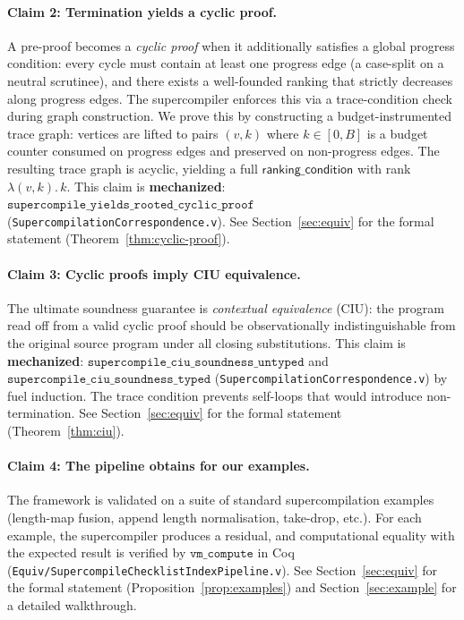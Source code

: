 \paragraph{Claim 2: Termination yields a cyclic proof.}
A pre-proof becomes a \emph{cyclic proof} when it additionally satisfies a global progress condition: every cycle must contain at least one progress edge (a case-split on a neutral scrutinee), and there exists a well-founded ranking that strictly decreases along progress edges.
The supercompiler enforces this via a trace-condition check during graph construction.
We prove this by constructing a budget-instrumented trace graph: vertices are lifted to pairs $(v,k)$ where $k \in [0, B]$ is a budget counter consumed on progress edges and preserved on non-progress edges.
The resulting trace graph is acyclic, yielding a full $\mathsf{ranking\_condition}$ with rank $\lambda(v,k).\,k$.
This claim is \textbf{mechanized}: $\texttt{supercompile\_yields\_rooted\_cyclic\_proof}$ (\texttt{SupercompilationCorrespondence.v}).
See Section~\ref{sec:equiv} for the formal statement (Theorem~\ref{thm:cyclic-proof}).

\paragraph{Claim 3: Cyclic proofs imply CIU equivalence.}
The ultimate soundness guarantee is \emph{contextual equivalence} (CIU): the program read off from a valid cyclic proof should be observationally indistinguishable from the original source program under all closing substitutions.
This claim is \textbf{mechanized}: $\texttt{supercompile\_ciu\_soundness\_untyped}$ and $\texttt{supercompile\_ciu\_soundness\_typed}$ (\texttt{SupercompilationCorrespondence.v}) by fuel induction. The trace condition prevents self-loops that would introduce non-termination.
See Section~\ref{sec:equiv} for the formal statement (Theorem~\ref{thm:ciu}).

\paragraph{Claim 4: The pipeline obtains for our examples.}
The framework is validated on a suite of standard supercompilation examples (length-map fusion, append length normalisation, take-drop, etc.).
For each example, the supercompiler produces a residual, and computational equality with the expected result is verified by $\mathtt{vm\_compute}$ in Coq (\texttt{Equiv/SupercompileChecklistIndexPipeline.v}).
See Section~\ref{sec:equiv} for the formal statement (Proposition~\ref{prop:examples}) and Section~\ref{sec:example} for a detailed walkthrough.

